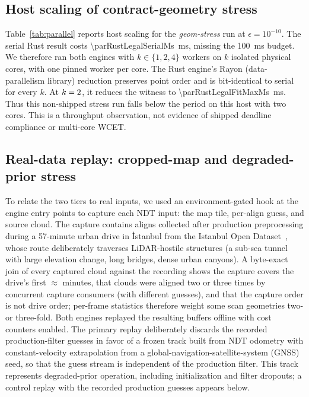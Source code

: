 \subsection{Host scaling of contract-geometry stress}
\label{sec:eval-parallel}


Table~\ref{tab:parallel} reports host scaling for the \emph{geom-stress} run at
$\epsilon=10^{-10}$. The
serial Rust result costs \SI{\parRustLegalSerialMs}{ms}, missing the
\SI{100}{ms} budget. We therefore ran both engines with $k\in\{1,2,4\}$ workers on $k$ isolated physical
cores, with one pinned worker per core. The Rust engine's Rayon (data-parallelism
library) reduction preserves point order and
is bit-identical to serial for every $k$. At $k=2$, it reduces the witness
to \SI{\parRustLegalFitMaxMs}{ms}. Thus this non-shipped stress run falls below the period
on this host with two cores. This is a throughput observation, not evidence of shipped
deadline compliance or multi-core WCET.

\subsection{Real-data replay: cropped-map and degraded-prior stress}
\label{sec:eval-realdata}
To relate the two tiers to real inputs, we used an environment-gated hook at the engine
entry points to capture each NDT input: the map tile, per-align guess, and source cloud. The
capture contains \realFrames{} aligns collected after production preprocessing during a
57-minute urban drive in İstanbul from the Istanbul Open Dataset~\cite{istanbulopendataset},
whose route deliberately traverses LiDAR-hostile structures (a sub-sea tunnel with large
elevation change, long bridges, dense urban canyons). A byte-exact join of every captured cloud against the
recording shows the capture covers the drive's first $\approx$\realCaptureSpanMin{} minutes, that \realDupClouds{} clouds
were aligned two or three times by concurrent capture consumers (with different guesses),
and that the capture order is not drive order; per-frame statistics therefore weight some
scan geometries two- or three-fold.
Both engines replayed the resulting buffers offline with
cost counters enabled. The primary replay deliberately discards the recorded
production-filter guesses in favor of a frozen track built from NDT odometry with
constant-velocity extrapolation from a global-navigation-satellite-system (GNSS) seed, so
that the guess stream is independent of the production filter. This track represents
degraded-prior operation, including initialization and filter dropouts; a control replay
with the recorded production guesses appears below.

